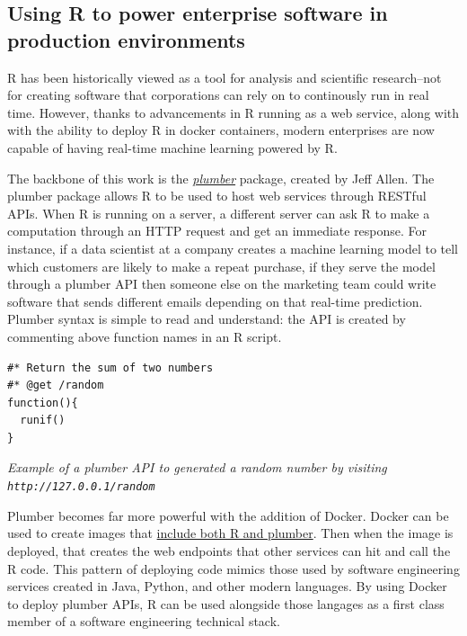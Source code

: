 \hypertarget{using-r-to-power-enterprise-software-in-production-environments-nolisticjnolis-nolistic}{%
\subsection{\texorpdfstring{Using R to power enterprise software in
production environments
\citep[\citet{nolistic}]{jnolis}}{Using R to power enterprise software in production environments , @nolistic{[}@jnolis, @nolistic{]}}}\label{using-r-to-power-enterprise-software-in-production-environments-nolisticjnolis-nolistic}}

R has been historically viewed as a tool for analysis and scientific
research--not for creating software that corporations can rely on to
continously run in real time. However, thanks to advancements in R
running as a web service, along with with the ability to deploy R in
docker containers, modern enterprises are now capable of having
real-time machine learning powered by R.

The backbone of this work is the
\emph{\href{https://www.rplumber.io/docs/hosting.html\#docker}{plumber}}
package, created by Jeff Allen. The plumber package allows R to be used
to host web services through RESTful APIs. When R is running on a
server, a different server can ask R to make a computation through an
HTTP request and get an immediate response. For instance, if a data
scientist at a company creates a machine learning model to tell which
customers are likely to make a repeat purchase, if they serve the model
through a plumber API then someone else on the marketing team could
write software that sends different emails depending on that real-time
prediction. Plumber syntax is simple to read and understand: the API is
created by commenting above function names in an R script.

\begin{verbatim}
#* Return the sum of two numbers
#* @get /random
function(){
  runif()
}
\end{verbatim}

\emph{Example of a plumber API to generated a random number by visiting
\texttt{http://127.0.0.1/random}}

Plumber becomes far more powerful with the addition of Docker. Docker
can be used to create images that
\href{https://www.rplumber.io/docs/hosting.html\#docker}{include both R
and plumber}. Then when the image is deployed, that creates the web
endpoints that other services can hit and call the R code. This pattern
of deploying code mimics those used by software engineering services
created in Java, Python, and other modern languages. By using Docker to
deploy plumber APIs, R can be used alongside those langages as a first
class member of a software engineering technical stack.

